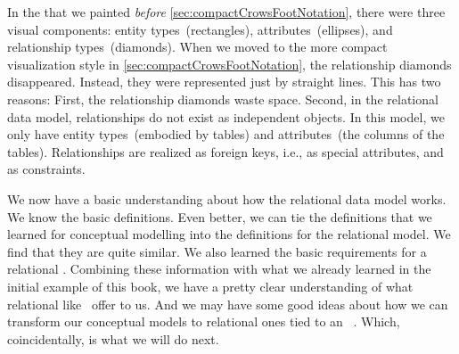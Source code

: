 %
\label{sec:relationalModel}%
%
In the  that we painted \emph{before} \cref{sec:compactCrowsFootNotation}, there were three visual components:
entity types~(rectangles), attributes~(ellipses), and relationship types~(diamonds).
When we moved to the more compact visualization style in \cref{sec:compactCrowsFootNotation}, the relationship diamonds disappeared.
Instead, they were represented just by straight lines.
This has two reasons:
First, the relationship diamonds waste space.
Second, in the relational data model, relationships do not exist as independent objects.
In this model, we only have entity types~(embodied by tables) and attributes~(the columns of the tables).
Relationships are realized as foreign keys, i.e., as special attributes, and as constraints.%
%
%
%
%

We now have a basic understanding about how the relational data model works.
We know the basic definitions.
Even better, we can tie the definitions that we learned for conceptual modelling into the definitions for the relational model.
We find that they are quite similar.
We also learned the basic requirements for a relational \dbms.
Combining these information with what we already learned in the initial example of this book, we have a pretty clear understanding of what relational  like \postgresql\ offer to us.
And we may have some good ideas about how we can transform our conceptual models to relational ones tied to an \sql\ \db.
Which, coincidentally, is what we will do next.%
\endhsection%
%
